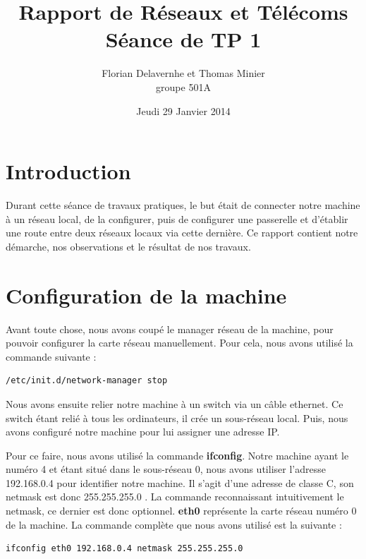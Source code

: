 \documentclass{article}
\title{Rapport de Réseaux et Télécoms \\ Séance de TP 1}
\author{Florian Delavernhe et Thomas Minier \\ groupe 501A}
\date{Jeudi 29 Janvier 2014}
\begin{document}
\maketitle
\vspace{5cm}
\tableofcontents
\newpage

\section{Introduction}

Durant cette séance de travaux pratiques, le but était de connecter notre machine à un réseau local, de la configurer, puis de configurer une passerelle et d'établir une route entre deux réseaux locaux via cette dernière. Ce rapport contient notre démarche, nos observations et le résultat de nos travaux.

\section{Configuration de la machine}

Avant toute chose, nous avons coupé le manager réseau de la machine, pour pouvoir configurer la carte réseau manuellement. Pour cela, nous avons utilisé la commande suivante :
\begin{verbatim}
/etc/init.d/network-manager stop
\end{verbatim}

Nous avons ensuite relier notre machine à un switch via un câble ethernet. Ce switch étant relié à tous les ordinateurs, il crée un sous-réseau local. Puis, nous avons configuré notre machine pour lui assigner une adresse IP.

Pour ce faire, nous avons utilisé la commande \textbf{ifconfig}. Notre machine ayant le numéro 4 et étant situé dans le sous-réseau 0, nous avons utiliser l'adresse 192.168.0.4 pour identifier notre machine. Il s'agit d'une adresse de classe C, son netmask est donc 255.255.255.0 . La commande reconnaissant intuitivement le netmask, ce dernier est donc optionnel. \textbf{eth0} représente la carte réseau numéro 0 de la machine. La commande complète que nous avons utilisé est la suivante :
\begin{verbatim}
ifconfig eth0 192.168.0.4 netmask 255.255.255.0
\end{verbatim}
\end{document}
